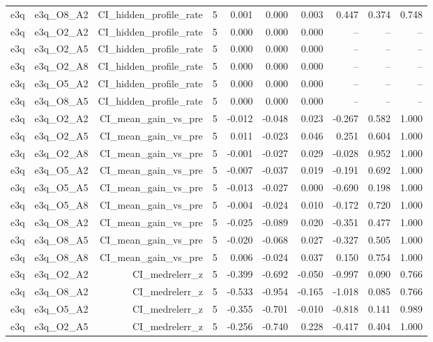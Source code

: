\documentclass[11pt]{article}
\begin{document}
\begin{landscape}
\begin{longtable}{@{}lrrrrrrrrr@{}}
e3q & e3q\_O8\_A2 & CI\_hidden\_profile\_rate & 5 & 0.001 & 0.000 & 0.003 & 0.447 & 0.374 & 0.748 \\
e3q & e3q\_O2\_A2 & CI\_hidden\_profile\_rate & 5 & 0.000 & 0.000 & 0.000 & -- & -- & -- \\
e3q & e3q\_O2\_A5 & CI\_hidden\_profile\_rate & 5 & 0.000 & 0.000 & 0.000 & -- & -- & -- \\
e3q & e3q\_O2\_A8 & CI\_hidden\_profile\_rate & 5 & 0.000 & 0.000 & 0.000 & -- & -- & -- \\
e3q & e3q\_O5\_A2 & CI\_hidden\_profile\_rate & 5 & 0.000 & 0.000 & 0.000 & -- & -- & -- \\
e3q & e3q\_O8\_A5 & CI\_hidden\_profile\_rate & 5 & 0.000 & 0.000 & 0.000 & -- & -- & -- \\
e3q & e3q\_O2\_A2 & CI\_mean\_gain\_vs\_pre & 5 & -0.012 & -0.048 & 0.023 & -0.267 & 0.582 & 1.000 \\
e3q & e3q\_O2\_A5 & CI\_mean\_gain\_vs\_pre & 5 & 0.011 & -0.023 & 0.046 & 0.251 & 0.604 & 1.000 \\
e3q & e3q\_O2\_A8 & CI\_mean\_gain\_vs\_pre & 5 & -0.001 & -0.027 & 0.029 & -0.028 & 0.952 & 1.000 \\
e3q & e3q\_O5\_A2 & CI\_mean\_gain\_vs\_pre & 5 & -0.007 & -0.037 & 0.019 & -0.191 & 0.692 & 1.000 \\
e3q & e3q\_O5\_A5 & CI\_mean\_gain\_vs\_pre & 5 & -0.013 & -0.027 & 0.000 & -0.690 & 0.198 & 1.000 \\
e3q & e3q\_O5\_A8 & CI\_mean\_gain\_vs\_pre & 5 & -0.004 & -0.024 & 0.010 & -0.172 & 0.720 & 1.000 \\
e3q & e3q\_O8\_A2 & CI\_mean\_gain\_vs\_pre & 5 & -0.025 & -0.089 & 0.020 & -0.351 & 0.477 & 1.000 \\
e3q & e3q\_O8\_A5 & CI\_mean\_gain\_vs\_pre & 5 & -0.020 & -0.068 & 0.027 & -0.327 & 0.505 & 1.000 \\
e3q & e3q\_O8\_A8 & CI\_mean\_gain\_vs\_pre & 5 & 0.006 & -0.024 & 0.037 & 0.150 & 0.754 & 1.000 \\
e3q & e3q\_O2\_A2 & CI\_medrelerr\_z & 5 & -0.399 & -0.692 & -0.050 & -0.997 & 0.090 & 0.766 \\
e3q & e3q\_O8\_A2 & CI\_medrelerr\_z & 5 & -0.533 & -0.954 & -0.165 & -1.018 & 0.085 & 0.766 \\
e3q & e3q\_O5\_A2 & CI\_medrelerr\_z & 5 & -0.355 & -0.701 & -0.010 & -0.818 & 0.141 & 0.989 \\
e3q & e3q\_O2\_A5 & CI\_medrelerr\_z & 5 & -0.256 & -0.740 & 0.228 & -0.417 & 0.404 & 1.000 \\

\end{longtable}
\end{landscape}
\end{document}
